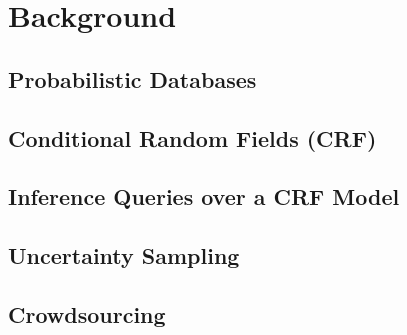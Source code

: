 \section{Background}

\subsection{Probabilistic Databases}

\subsection{Conditional Random Fields (CRF)}

\subsection{Inference Queries over a CRF Model}

\subsection{Uncertainty Sampling}

\subsection{Crowdsourcing}
